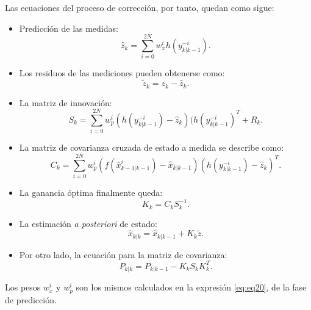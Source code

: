 \begin{enumerate}
Las ecuaciones del proceso de correcci\'on, por tanto, quedan como sigue:
\begin{itemize}
\item Predicci\'on de las medidas:\\
\begin{equation}
\label{eq:eq25}
\hat{z}_{k} = \sum_{i=0}^{2N} w_x^i h(y_{k|k-1}^{-i}).
\end{equation}
\item Los residuos de las mediciones pueden obtenerse como:\\
\begin{equation}
\tilde{z}_k = z_k - \hat{z}_k.
\label{eq:eq26}
\end{equation}
\item La matriz de innovaci\'on:\\
\begin{equation}
S_k = \sum_{i=0}^{2N} w_p^i (h(y_{k|k-1}^{-i}) - \hat{z}_k)(h(y_{k|k-1}^{-i})^T + R_k.
\label{eq:eq27}
\end{equation}
\item La matriz de covarianza cruzada de estado a medida se describe como:\\
\begin{equation}
C_k = \sum_{i=0}^{2N} w_p^i ( f(\bar{x}^i_{k-1 | k-1})- \hat{x}_{k|k-1} )( h(y_{k|k-1}^{-i}) - \hat{z}_k )^T.
\label{eq:eq28}
\end{equation}
\item La ganancia \'optima finalmente queda:\\
\begin{equation}
K_k = C_kS_k^{-1}.
\label{eq:eq29}
\end{equation}
\item La estimaci\'on \textit{a posteriori} de estado:\\
\begin{equation}
\label{eq:eq30}
 \hat{x}_{k|k} =  \hat{x}_{k|k-1} + K_k \tilde{z}.
\end{equation}
\item Por otro lado, la ecuaci\'on para la matriz de covarianza:\\
\begin{equation}
\label{eq:eq31}
P_{k|k} = P_{k|k-1} - K_kS_kK_k^T.
\end{equation}
\end{itemize}
Los pesos $w_x^i$ y $w_p^i$ son los mismos calculados en la expresi\'on \ref{eq:eq20}, de la fase de predicci\'on.
\end{enumerate}

